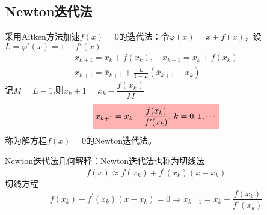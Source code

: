 \subsection{Newton迭代法}
\begin{definition}[Newton迭代法公式]
    采用Aitken方法加速$f(x)=0$的迭代法：令$\varphi(x) = x+f(x)$，设$L = \varphi'(x) = 1+f'(x)$
    \[
        \begin{gathered}
            x_{k+1}=x_k+f(x_k),\quad  \bar{x}_{k+1}=x_k+f(x_k)\\
            x_{k+1}=\bar{x}_{k+1}+\frac{L}{1-L}(\bar{x}_{k+1}-x_k)
        \end{gathered}
    \]
    记$M=L-1$,则$x_k+1=x_k-\dfrac{f(x_k)}M$
    \[
        \colorbox{red!30}{$x_{k+1}=x_k-\dfrac{f(x_k)}{f'(x_k)},\,k=0,1,\cdots$}    
    \]
    \colorbox{red!30}{称为解方程$f(x)= 0$的Newton迭代法。}
\end{definition}
\begin{note}
    Newton迭代法几何解释：\colorbox{yellow!50}{Newton迭代法也称为切线法}
    \[
        f(x)\approx f(x_k)+f^{\prime}(x_k)(x-x_k)
    \]
    切线方程
    \[
        f(x_k)+f^{\prime}(x_k)(x-x_k)=0 \Rightarrow x_{k+1}=x_k-\frac{f(x_k)}{f'(x_k)}  
    \]
\end{note}
